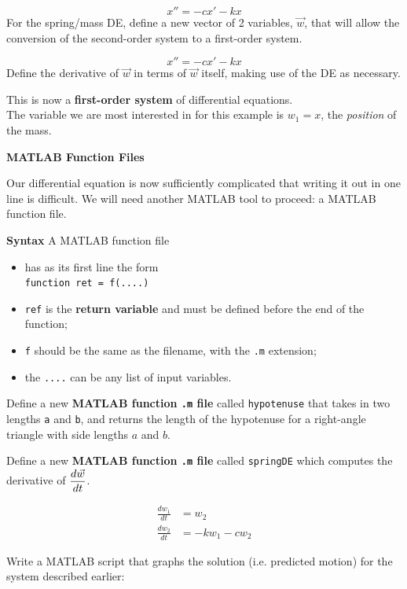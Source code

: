 $$ x'' = -c x' -kx $$
\problem For the spring/mass DE, define a new vector of 2 variables,
$\vec{w}$, that will allow the conversion of the second-order system
to a first-order system.


\newpage
$$ x'' = -c x' -kx $$
\problem Define the derivative of $\vec{w}$ in terms of $\vec{w}$
itself, making use of the DE as necessary.

\vfill
\vfill

This is now a {\bf first-order system} of differential equations.  \\
The variable we are most interested in for this example is $w_1 = x$,
the {\em position} of the mass.

\newpage

{\bf MATLAB Function Files}

Our differential equation is now sufficiently complicated that writing
it out in one line is difficult.  We will need another MATLAB tool to
proceed: a MATLAB function file.


{\bf Syntax} A MATLAB function file
\begin{itemize}
\item has as its first line the form \\
\verb#function ret = f(....)# 
\item \verb#ref# is the {\bf return variable} and must be defined before the end of the function;
\item \verb#f# should be the same as the filename, with the \verb#.m# extension;
\item the \verb#....# can be any list of input variables.
\end{itemize}

\newpage
\problem Define a new {\bf MATLAB function \texttt{.m} file} called
\verb#hypotenuse# that takes in two lengths \verb#a# and \verb#b#, and
returns the length of the hypotenuse for a right-angle triangle with
side lengths $a$ and $b$.

\newpage
\problem Define a new {\bf MATLAB function \texttt{.m} file} called
\verb#springDE# which computes the derivative of
$\displaystyle \frac{d \vec{w}}{dt}$.

\begin{align*}
  \frac{dw_1}{dt} & = w_2 \\
  \frac{dw_2}{dt} & = -k w_1 - c w_2
\end{align*}


\newpage 
\problem Write a MATLAB script that graphs the solution
(i.e. predicted motion) for the system described earlier:

